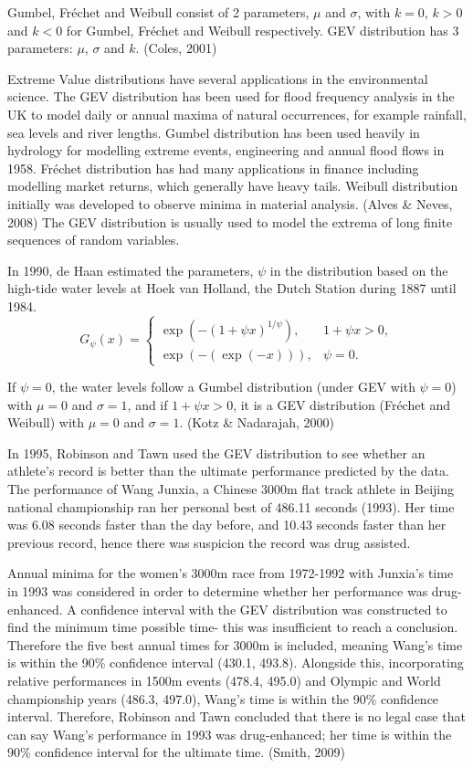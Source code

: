 \documentclass{article}
\begin{document}
Gumbel, Fr\'echet and Weibull consist of 2 parameters, $\mu$ and $\sigma$, with $k=0$, $k>0$ and $k<0$ for Gumbel, Fr\'echet and Weibull respectively. GEV distribution has 3 parameters: $\mu$, $\sigma$ and $k$. (Coles, 2001)

Extreme Value distributions have several applications in the environmental science. The GEV distribution has been used for flood frequency analysis in the UK to model daily or annual maxima of natural occurrences, for example rainfall, sea levels and river lengths.
Gumbel distribution has been used heavily in hydrology for modelling extreme events, engineering and annual flood flows in 1958. Fr\'echet distribution has had many applications in finance including modelling market returns, which generally have heavy tails. Weibull distribution initially was developed to observe minima in material analysis. (Alves \& Neves, 2008) The GEV distribution is usually used to model the extrema of long finite sequences of random variables.

In 1990, de Haan estimated the parameters, $\psi$ in the distribution based on the high-tide water levels at Hoek van Holland, the Dutch Station during 1887 until 1984.
\begin{equation*}
    G_\psi(x) = \begin{cases}
    \exp(-(1+\psi x)^{1/\psi}), & \text{$1 + \psi x > 0$},\\
    \exp(-(\exp(-x))), & \text{$\psi=0$}.
  \end{cases}
\end{equation*}

If $\psi = 0$, the water levels follow a Gumbel distribution (under GEV with $\psi=0$) with $\mu=0$ and $\sigma=1$, and if $1+ \psi x >0$, it is a GEV distribution (Fr\'echet and Weibull) with $\mu=0$ and $\sigma=1$. (Kotz \& Nadarajah, 2000)

In 1995, Robinson and Tawn used the GEV distribution to see whether an athlete's record is better than the ultimate performance predicted by the data. The performance of Wang Junxia, a Chinese 3000m flat track athlete in Beijing national championship ran her personal best of 486.11 seconds (1993). Her time was 6.08 seconds faster than the day before, and 10.43 seconds faster than her previous record, hence there was suspicion the record was drug assisted.

Annual minima for the women's 3000m race from 1972-1992 with Junxia's time in 1993 was considered in order to determine whether her performance was drug-enhanced. A confidence interval with the GEV distribution was constructed to find the minimum time possible time- this was insufficient to reach a conclusion. Therefore the five best annual times for 3000m is included, meaning Wang's time is within the 90\% confidence interval (430.1, 493.8). Alongside this, incorporating relative performances in 1500m events (478.4, 495.0) and Olympic and World championship years (486.3, 497.0), Wang's time is within the 90\% confidence interval. Therefore, Robinson and Tawn concluded that there is no legal case that can say Wang's performance in 1993 was drug-enhanced; her time is within the 90\% confidence interval for the ultimate time. (Smith, 2009)
\end{document}
